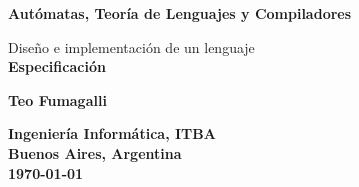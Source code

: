 \begin{titlepage}
  \begin{center}
    \vspace*{1cm}
    \textbf{Autómatas, Teoría de Lenguajes y Compiladores}

    \vspace{1cm}
    \large{Diseño e implementación de un lenguaje}\\
    \Large\textbf{Especificación}

    \vspace{1cm}
    \large\textbf{Teo Fumagalli}

    \vfill

    \normalsize
    \textbf{Ingeniería Informática, ITBA}\\
    \textbf{Buenos Aires, Argentina}\\
    \textbf{\today}
    \vspace*{1cm}

  \end{center}
\end{titlepage}
